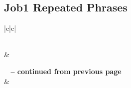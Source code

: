 \subsection{Job1 Repeated Phrases}


\normalsize
 
\begin{center}
\begin{longtable}{|c|c|}
\caption[Job1 Repeated Phrases]{Job1 Repeated Phrases}\label{table:Repeated Phrases Job1} \\
\hline {} &  \\ \hline 
\endfirsthead
 
{{\bfseries \tablename\ \thetable{} -- continued from previous page}} \\  
\hline {} &  \\ \hline 
\endhead
 

\end{longtable}
\end{center}
